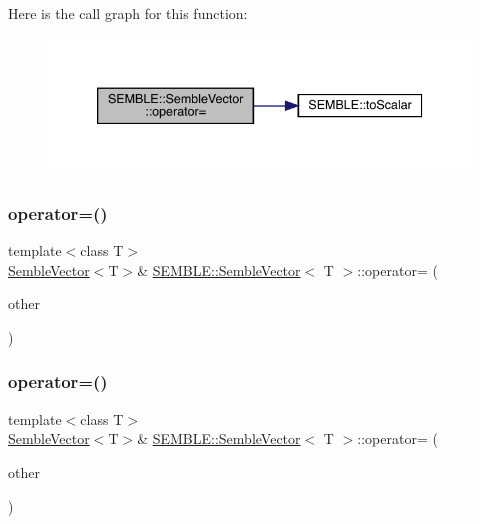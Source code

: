 Here is the call graph for this function\+:
\nopagebreak
\begin{figure}[H]
\begin{center}
\leavevmode
\includegraphics[width=339pt]{d9/d94/structSEMBLE_1_1SembleVector_a77509266a73ada965ab9b6a598922a75_cgraph}
\end{center}
\end{figure}
\mbox{\label{structSEMBLE_1_1SembleVector_ab62457b0d29303d0aa977eb75101c81e}} 
\subsubsection{\texorpdfstring{operator=()}{operator=()}\hspace{0.1cm}{\footnotesize\ttfamily [4/8]}}
{\footnotesize\ttfamily template$<$class T$>$ \\
\mbox{\hyperlink{structSEMBLE_1_1SembleVector}{Semble\+Vector}}$<$T$>$\& \mbox{\hyperlink{structSEMBLE_1_1SembleVector}{S\+E\+M\+B\+L\+E\+::\+Semble\+Vector}}$<$ T $>$\+::operator= (\begin{DoxyParamCaption}\item[{const typename \mbox{\hyperlink{structSEMBLE_1_1PromoteEnsemVec}{Promote\+Ensem\+Vec}}$<$ T $>$\+::Type \&}]{other }\end{DoxyParamCaption})}

\mbox{\label{structSEMBLE_1_1SembleVector_a840cf4b02e399eb2987a52e3dec3aa34}} 
\subsubsection{\texorpdfstring{operator=()}{operator=()}\hspace{0.1cm}{\footnotesize\ttfamily [5/8]}}
{\footnotesize\ttfamily template$<$class T$>$ \\
\mbox{\hyperlink{structSEMBLE_1_1SembleVector}{Semble\+Vector}}$<$T$>$\& \mbox{\hyperlink{structSEMBLE_1_1SembleVector}{S\+E\+M\+B\+L\+E\+::\+Semble\+Vector}}$<$ T $>$\+::operator= (\begin{DoxyParamCaption}\item[{const itpp\+::\+Vec$<$ T $>$ \&}]{other }\end{DoxyParamCaption})}

